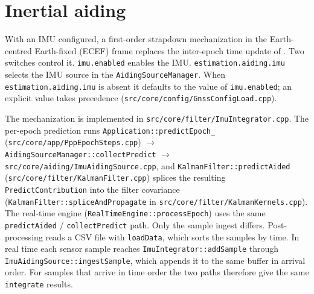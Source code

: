 \documentclass[main.tex]{subfiles}
\begin{document}
\section{Inertial aiding}\label{sec:imu}
%
%

With an IMU configured, a first-order strapdown mechanization in the
Earth-centred Earth-fixed (ECEF) frame replaces the inter-epoch time
update of .  Two switches control
it.  \texttt{imu.enabled} enables the IMU.  \texttt{estimation.aiding.imu}
selects the IMU source in the \texttt{AidingSourceManager}.  When
\texttt{estimation.aiding.imu} is absent it defaults to the value of
\texttt{imu.enabled}; an explicit value takes precedence
(\texttt{src/core/config/GnssConfigLoad.cpp}).

The mechanization is implemented in
\texttt{src/core/filter/ImuIntegrator.cpp}.  The per-epoch prediction
runs \texttt{Application::predictEpoch\_}
(\texttt{src/core/app/PppEpochSteps.cpp}) $\to$
\texttt{AidingSourceManager::collectPredict} $\to$
\texttt{src/core/aiding/ImuAidingSource.cpp}, and
\texttt{KalmanFilter::predictAided}
(\texttt{src/core/filter/KalmanFilter.cpp}) splices the resulting
\texttt{PredictContribution} into the filter covariance
(\texttt{KalmanFilter::spliceAndPropagate} in
\texttt{src/core/filter/KalmanKernels.cpp}).  The real-time
engine (\texttt{RealTimeEngine::processEpoch}) uses the same
\texttt{predictAided} $/$ \texttt{collectPredict} path.  Only the sample
ingest differs.  Post-processing reads a CSV file with
\texttt{loadData}, which sorts the samples by time.  In real time each
sensor sample reaches \texttt{ImuIntegrator::addSample} through
\texttt{ImuAidingSource::ingestSample}, which appends it
to the same buffer in arrival order.  For samples that arrive in time
order the two paths therefore give the same \texttt{integrate} results.
\end{document}
